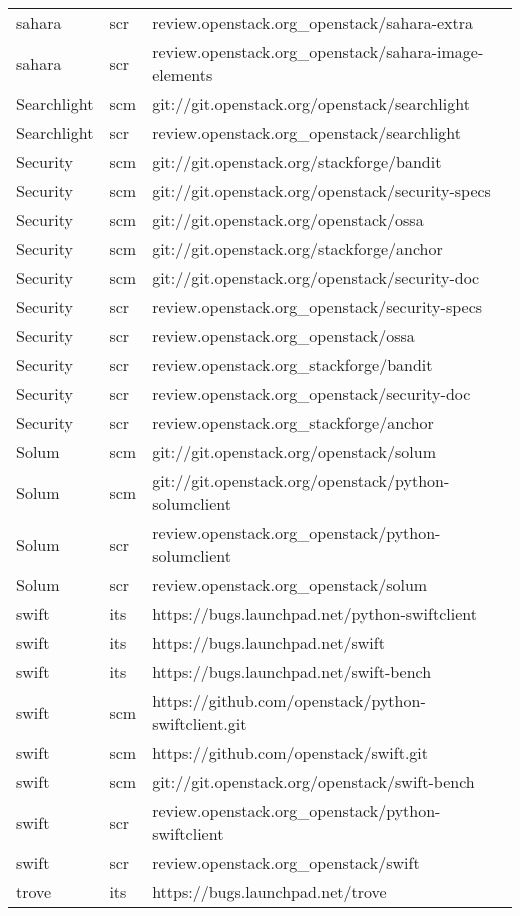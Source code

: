 \begin{center}
\begin{longtable}{|p{4cm}|p{1cm}|p{10cm}|}
sahara&scr&review.openstack.org\_openstack/sahara-extra\\ 
sahara&scr&review.openstack.org\_openstack/sahara-image-elements\\ 
Searchlight&scm&git://git.openstack.org/openstack/searchlight\\ 
Searchlight&scr&review.openstack.org\_openstack/searchlight\\ 
Security&scm&git://git.openstack.org/stackforge/bandit\\ 
Security&scm&git://git.openstack.org/openstack/security-specs\\ 
Security&scm&git://git.openstack.org/openstack/ossa\\ 
Security&scm&git://git.openstack.org/stackforge/anchor\\ 
Security&scm&git://git.openstack.org/openstack/security-doc\\ 
Security&scr&review.openstack.org\_openstack/security-specs\\ 
Security&scr&review.openstack.org\_openstack/ossa\\ 
Security&scr&review.openstack.org\_stackforge/bandit\\ 
Security&scr&review.openstack.org\_openstack/security-doc\\ 
Security&scr&review.openstack.org\_stackforge/anchor\\ 
Solum&scm&git://git.openstack.org/openstack/solum\\ 
Solum&scm&git://git.openstack.org/openstack/python-solumclient\\ 
Solum&scr&review.openstack.org\_openstack/python-solumclient\\ 
Solum&scr&review.openstack.org\_openstack/solum\\ 
swift&its&https://bugs.launchpad.net/python-swiftclient\\ 
swift&its&https://bugs.launchpad.net/swift\\ 
swift&its&https://bugs.launchpad.net/swift-bench\\ 
swift&scm&https://github.com/openstack/python-swiftclient.git\\ 
swift&scm&https://github.com/openstack/swift.git\\ 
swift&scm&git://git.openstack.org/openstack/swift-bench\\ 
swift&scr&review.openstack.org\_openstack/python-swiftclient\\ 
swift&scr&review.openstack.org\_openstack/swift\\ 
trove&its&https://bugs.launchpad.net/trove\\ 

\end{longtable}
\end{center}
